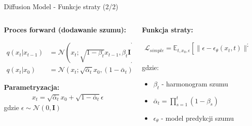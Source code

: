 \documentclass{beamer}
\begin{document}
\begin{frame}{Diffusion Model - Funkcje straty (2/2)}
  \begin{columns}
    \begin{column}{0.5\textwidth}
      \textbf{Proces forward (dodawanie szumu):}
      \begin{tcolorbox}[colback=yellow!10!white, colframe=black!60, boxrule=0.5pt, arc=3mm]
        \begin{align*}
          q(x_t|x_{t-1}) &= \mathcal{N}(x_t; \sqrt{1-\beta_t}x_{t-1}, \beta_t\mathbf{I}) \\
          q(x_t|x_0) &= \mathcal{N}(x_t; \sqrt{\bar{\alpha}_t}x_0, (1-\bar{\alpha}_t)\mathbf{I})
        \end{align*}
      \end{tcolorbox}
      
      \textbf{Parametryzacja:}
      \begin{align*}
        x_t = \sqrt{\bar{\alpha}_t}x_0 + \sqrt{1-\bar{\alpha}_t}\epsilon
      \end{align*}
      gdzie $\epsilon \sim \mathcal{N}(0, \mathbf{I})$
    \end{column}
    \begin{column}{0.5\textwidth}
      \textbf{Funkcja straty:}
      \begin{tcolorbox}[colback=yellow!10!white, colframe=black!60, boxrule=0.5pt, arc=3mm]
        \begin{align*}
          \mathcal{L}_{simple} = \mathbb{E}_{t,x_0,\epsilon} \left[ \|\epsilon - \epsilon_\theta(x_t, t)\|^2 \right]
        \end{align*}
      \end{tcolorbox}
      
      gdzie:
      \begin{itemize}
        \item $\beta_t$ - harmonogram szumu
        \item $\bar{\alpha}_t = \prod_{s=1}^{t} (1-\beta_s)$
        \item $\epsilon_\theta$ - model predykcji szumu
      \end{itemize}
    \end{column}
  \end{columns}
\end{frame}
\end{document}

